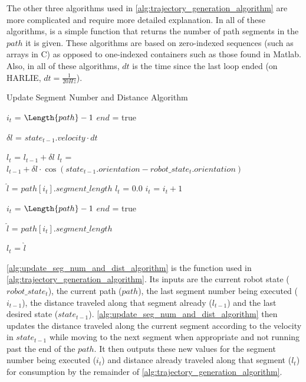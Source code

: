 
The other three algorithms used in \autoref{alg:trajectory_generation_algorithm} are more complicated and require more detailed explanation. In all of these algorithms, \Length is a simple function that returns the number of path segments in the $path$ it is given. These algorithms are based on zero-indexed sequences (such as arrays in C) as opposed to one-indexed containers such as those found in Matlab. Also, in all of these algorithms, $dt$ is the time since the last loop ended (on HARLIE, $dt = \frac{1}{20 Hz}$).

\begin{algorithm}
\caption{Update Segment Number and Distance Algorithm}
\label{alg:update_seg_num_and_dist_algorithm}
\DontPrintSemicolon


{
	$i_t$ = $\Length{path}-1$ \;
	$end$ = true \;
}

$\delta l$ = $state_{t-1}.velocity \cdot dt$ \;

{
	$l_t$ = $l_{t-1} + \delta l$ \;	
}
{
	$l_t$ = $l_{t-1} + \delta l \cdot \cos\left(state_{t-1}.orientation - robot\_state_t.orientation\right) $ \; 
}

$\hat l$ = $path\left[i_t\right].segment\_length$ \;
{
	$l_t$ = $0.0$ \;
	$i_t$ = $i_t + 1$ \;
}

{
	$i_t$ = $\Length{path}-1$ \;
	$end$ = true \;
}

$\hat l$ = $path\left[i_t\right].segment\_length$ \; 

{
	$l_t$ = $\hat l$ \;
}

\end{algorithm}

\autoref{alg:update_seg_num_and_dist_algorithm} is the \UpdateSegmentNumberAndDistance function used in \autoref{alg:trajectory_generation_algorithm}. Its inputs are the current robot state ($robot\_state_t$), the current path ($path$), the last segment number being executed ($i_{t-1}$), the distance traveled along that segment already ($l_{t-1}$) and the last desired state ($state_{t-1}$). \autoref{alg:update_seg_num_and_dist_algorithm} then updates the distance traveled along the current segment according to the velocity in $state_{t-1}$ while moving to the next segment when appropriate and not running past the end of the $path$. It then outputs these new values for the segment number being executed ($i_t$) and distance already traveled along that segment ($l_t$) for consumption by the remainder of \autoref{alg:trajectory_generation_algorithm}.


